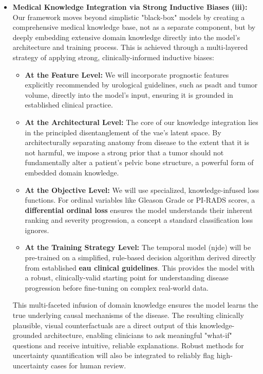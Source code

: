 \documentclass[11pt, a4paper]{article}
\begin{document}
\begin{itemize}
    \item \textbf{Medical Knowledge Integration via Strong Inductive Biases (iii):} Our framework moves beyond simplistic "black-box" models by creating a comprehensive medical knowledge base, not as a separate component, but by deeply embedding extensive domain knowledge directly into the model's architecture and training process. This is achieved through a multi-layered strategy of applying strong, clinically-informed inductive biases:
    \begin{itemize}
        \item \textbf{At the Feature Level:} We will incorporate prognostic features explicitly recommended by urological guidelines, such as \gls{psadt} and tumor volume, directly into the model's input, ensuring it is grounded in established clinical practice.
        \item \textbf{At the Architectural Level:} The core of our knowledge integration lies in the principled disentanglement of the \gls{vae}'s latent space. By architecturally separating anatomy from disease to the extent that it is not harmful, we impose a strong prior that a tumor should not fundamentally alter a patient's pelvic bone structure, a powerful form of embedded domain knowledge.
        \item \textbf{At the Objective Level:} We will use specialized, knowledge-infused loss functions. For ordinal variables like Gleason Grade or PI-RADS scores, a \textbf{differential ordinal loss} ensures the model understands their inherent ranking and severity progression, a concept a standard classification loss ignores.
        \item \textbf{At the Training Strategy Level:} The temporal model (\gls{njde}) will be pre-trained on a simplified, rule-based decision algorithm derived directly from established \textbf{\gls{eau} clinical guidelines}. This provides the model with a robust, clinically-valid starting point for understanding disease progression before fine-tuning on complex real-world data.
    \end{itemize}
    This multi-faceted infusion of domain knowledge ensures the model learns the true underlying causal mechanisms of the disease. The resulting clinically plausible, visual counterfactuals are a direct output of this knowledge-grounded architecture, enabling clinicians to ask meaningful "what-if" questions and receive intuitive, reliable explanations. Robust methods for uncertainty quantification will also be integrated to reliably flag high-uncertainty cases for human review.
\end{itemize}
\end{document}
